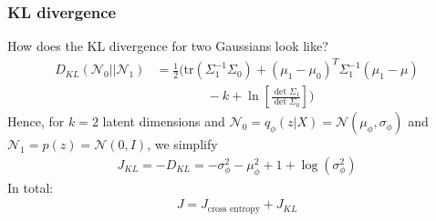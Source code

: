 \documentclass{beamer}
\newcommand{\cN}{\mathcal{N}}
\begin{document}
\begin{frame}
\frametitle{KL divergence}

How does the KL divergence for two Gaussians look like?
\begin{align}
	D_{KL} (\cN_0 || \cN_1) &= \frac{1}{2} \bigg( \text{tr} ( \Sigma_1^{-1} \Sigma_0) + (\mu_1 - \mu_0)^T \Sigma_1^{-1} (\mu_1 - \mu) \nonumber  \\
	& \qquad \qquad   - k + \ln \left[ \frac{\det \Sigma_1}{\det \Sigma_0}\right] \bigg)
\end{align}
Hence, for $k=2$ latent dimensions and $\cN_0 = q_\phi (z|X) = \cN (\mu_\phi, \sigma_\phi) $ and $\cN_1 = p (z) = \cN(0,I)$, we simplify
\begin{align}
	J_{KL} = - D_{KL} = - \sigma^2_\phi - \mu_\phi^2 + 1 + \log(\sigma^2_\phi)
\end{align}
In total:
\begin{align}
 J = J_{\text{cross entropy}} + J_{KL} 
\end{align}


\end{frame}
\end{document}

